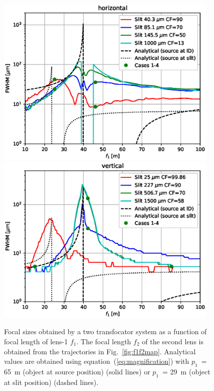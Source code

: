 \documentclass{iucr}              %
\newcommand{\ingreen}[1]{{\color{green}#1}}
\begin{document}
\begin{figure}
    \centering
    
    \includegraphics[width=0.95\textwidth]{figures/sizes_h.eps}
    \includegraphics[width=0.95\textwidth]{figures/sizes_v.eps}
        
    \caption{Focal sizes obtained by a two transfocator system as a function of focal length of lens-1 $f_1$. The focal length $f_2$ of the second lens is obtained from the trajectories in Fig.~\ref{fig:f1f2map}. 
    Analytical values are obtained using equation~(\ref{eq:magnification}) with $p_1$~= \SI{65}{\meter} (object at source position) (solid lines) or $p_1$~= \SI{29}{\meter} (object at slit position) (dashed lines). 
    }
    \label{fig:focalSizes}
\end{figure}
\end{document}
